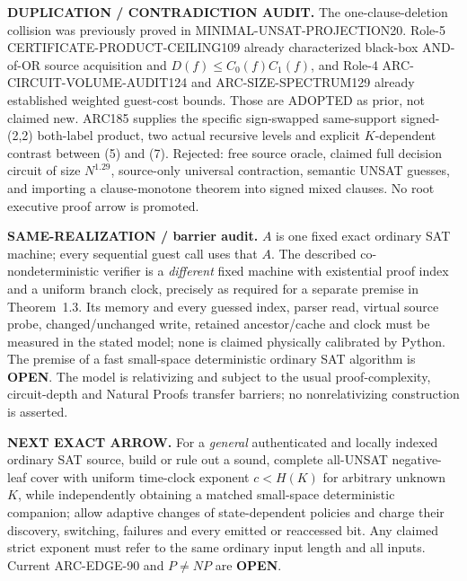 \documentclass[11pt]{article}
\newcommand{\OPEN}{\textbf{OPEN}}
\begin{document}
\textbf{DUPLICATION / CONTRADICTION AUDIT.} The one-clause-deletion collision was previously proved in MINIMAL-UNSAT-PROJECTION20. Role-5 CERTIFICATE-PRODUCT-CEILING109 already characterized black-box AND-of-OR source acquisition and $D(f)\le C_0(f)C_1(f)$, and Role-4 ARC-CIRCUIT-VOLUME-AUDIT124 and ARC-SIZE-SPECTRUM129 already established weighted guest-cost bounds. Those are ADOPTED as prior, not claimed new. ARC185 supplies the specific sign-swapped same-support signed-(2,2) both-label product, two actual recursive levels and explicit $K$-dependent contrast between (5) and (7). Rejected: free source oracle, claimed full decision circuit of size $N^{1.29}$, source-only universal contraction, semantic UNSAT guesses, and importing a clause-monotone theorem into signed mixed clauses. No root executive proof arrow is promoted.

\textbf{SAME-REALIZATION / barrier audit.} $A$ is one fixed exact ordinary SAT machine; every sequential guest call uses that $A$. The described co-nondeterministic verifier is a \emph{different} fixed machine with existential proof index and a uniform branch clock, precisely as required for a separate premise in Theorem~1.3. Its memory and every guessed index, parser read, virtual source probe, changed/unchanged write, retained ancestor/cache and clock must be measured in the stated model; none is claimed physically calibrated by Python. The premise of a fast small-space deterministic ordinary SAT algorithm is \OPEN. The model is relativizing and subject to the usual proof-complexity, circuit-depth and Natural Proofs transfer barriers; no nonrelativizing construction is asserted.

\textbf{NEXT EXACT ARROW.} For a \emph{general} authenticated and locally indexed ordinary SAT source, build or rule out a sound, complete all-UNSAT negative-leaf cover with uniform time-clock exponent $c<H(K)$ for arbitrary unknown $K$, while independently obtaining a matched small-space deterministic companion; allow adaptive changes of state-dependent policies and charge their discovery, switching, failures and every emitted or reaccessed bit. Any claimed strict exponent must refer to the same ordinary input length and all inputs. Current ARC-EDGE-90 and $P\ne NP$ are \OPEN.



\end{document}

